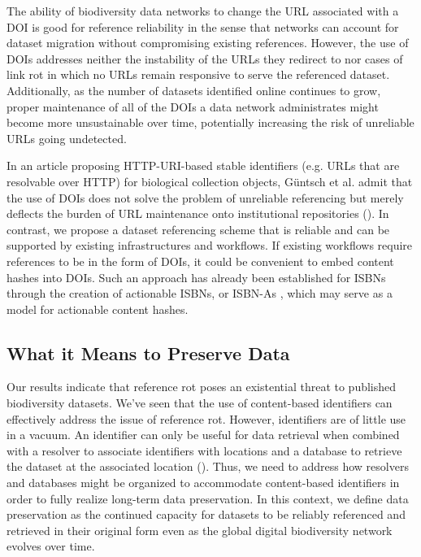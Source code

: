 \documentclass[10pt,letterpaper]{article}
\begin{document}
The ability of biodiversity data networks to change the URL associated with a DOI is good for reference reliability in the sense that networks can account for dataset migration without compromising existing references. However, the use of DOIs addresses neither the instability of the URLs they redirect to nor cases of link rot in which no URLs remain responsive to serve the referenced dataset. Additionally, as the number of datasets identified online continues to grow, proper maintenance of all of the DOIs a data network administrates might become more unsustainable over time, potentially increasing the risk of unreliable URLs going undetected. 

In an article proposing HTTP-URI-based stable identifiers (e.g. URLs that are resolvable over HTTP) for biological collection objects, Güntsch et al. admit that the use of DOIs does not solve the problem of unreliable referencing but merely deflects the burden of URL maintenance onto institutional repositories (\cite{G_ntsch_2017}). In contrast, we propose a dataset referencing scheme that is reliable and can be supported by existing infrastructures and workflows. If existing workflows require references to be in the form of DOIs, it could be convenient to embed content hashes into DOIs. Such an approach has already been established for ISBNs through the creation of actionable ISBNs, or ISBN-As \cite{Weissberg_2008}, which may serve as a model for actionable content hashes. 

\subsection*{What it Means to Preserve Data} 

Our results indicate that reference rot poses an existential threat to published biodiversity datasets. We’ve seen that the use of content-based identifiers can effectively address the issue of reference rot. However, identifiers are of little use in a vacuum. An identifier can only be useful for data retrieval when combined with a resolver to associate identifiers with locations and a database to retrieve the dataset at the associated location (\cite{Paskin_1999}). Thus, we need to address how resolvers and databases might be organized to accommodate content-based identifiers in order to fully realize long-term data preservation. In this context, we define data preservation as the continued capacity for datasets to be reliably referenced and retrieved in their original form even as the global digital biodiversity network evolves over time. 
\end{document}
